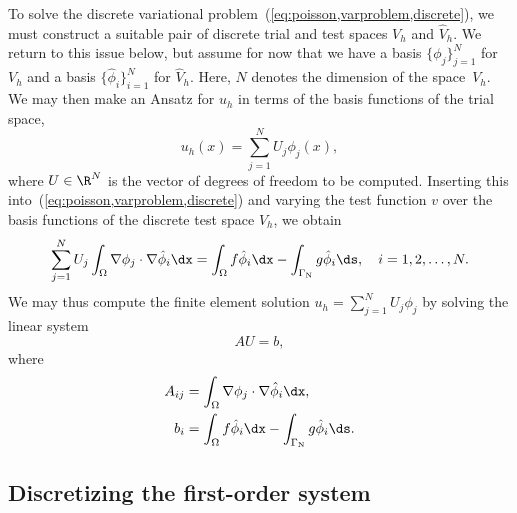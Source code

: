 To solve the discrete variational
problem~(\ref{eq:poisson,varproblem,discrete}), we must construct a
suitable pair of discrete trial and test spaces $V_h$ and $\hat{V}_h$.
We return to this issue below, but assume for now that we have a basis
$\{\phi_j\}_{j=1}^N$ for $V_h$ and a basis $\{\hat{\phi}_i\}_{i=1}^N$
for $\hat{V}_h$. Here, $N$ denotes the dimension of the space~$V_h$.
We may then make an Ansatz for $u_h$ in terms of the basis functions
of the trial space,
%
%
\begin{equation}
  u_h(x) = \sum_{j=1}^N U_j \phi_j(x),
\end{equation}
where $U \in \R^N$ is the vector of degrees of freedom to be computed.
Inserting this into~(\ref{eq:poisson,varproblem,discrete}) and varying
the test function $v$ over the basis functions of the discrete test
space $\hat{V}_h$, we obtain
\begin{equation}
  \sum_{j=1}^N U_j \int_{\Omega} \nabla \phi_j \cdot \nabla \hat{\phi}_i \dx =
  \int_{\Omega} f \hat{\phi}_i \dx - \int_{\Gamma_{\mathrm{N}}} g \hat{\phi}_i \ds,
  \quad i = 1,2,\ldots,N.
\end{equation}
We may thus compute the finite element solution $u_h = \sum_{j=1}^N
U_j \phi_j$ by solving the linear system
\begin{equation}
  AU = b,
\end{equation}
where
\begin{equation}
\begin{split}
  A_{ij} &= \int_{\Omega} \nabla \phi_j \cdot \nabla \hat{\phi}_i \dx, \\
  b_i &= \int_{\Omega} f \hat{\phi}_i \dx - \int_{\Gamma_{\mathrm{N}}} g \hat{\phi}_i \ds.
\end{split}
\end{equation}

\subsection{Discretizing the first-order system}
\label{sec:kirby-7:mixed}

